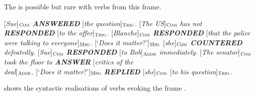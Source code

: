 \documentclass[output=paper,colorlinks,citecolor=brown]{langscibook}
\begin{document}
The  is possible but rare with verbs from this frame.

\begin{exe}
\ex \label{ex:08response}
\begin{xlist}
\ex \label{ex:08response:a}
{[}\textit{Sue}{]}$_{\text{\textsc{Com}}}$  \textit{\textbf{ANSWERED}} [\textit{the question}]$_{\text{\textsc{Trig}}}$.
\ex \label{ex:08response:b}
{[}\textit{The US}{]}$_{\text{\textsc{Com}}}$  \textit{has not \textbf{RESPONDED}} [\textit{to the offer}]$_{\text{\textsc{Trig}}}$.
\ex \label{ex:08response:c}
{[}\textit{Blanche}{]}$_{\text{\textsc{Com}}}$  \textit{\textbf{RESPONDED}} [\textit{that the police were talking to \newline everyone}]$_{\text{\textsc{Msg}}}$.
\ex \label{ex:08response:d}
{[}`\textit{Does it matter}?']$_{\text{\textsc{Msg}}}$  [\textit{she}]$_{\text{\textsc{Com}}}$  \textit{\textbf{COUNTERED} defeatedly}.
\ex \label{ex:08response:e}
{[}\textit{Sue}{]}$_{\text{\textsc{Com}}}$  \textit{\textbf{RESPONDED}} [\textit{to Bob}]$_{\text{\textsc{Addr}}}$  \textit{immediately}. 
\ex \label{ex:08response:f}
{[}\textit{The senator}{]}$_{\text{\textsc{Com}}}$  \textit{took the floor to \textbf{ANSWER}} [\textit{critics of the \\deal}]$_{\text{\textsc{Addr}}}$. 
\ex \label{ex:08response:g}
{[}`\textit{Does it matter}?']$_{\text{\textsc{Msg}}}$ \textit{\textbf{REPLIED}} [\textit{she}]$_{\text{\textsc{Com}}}$   [\textit{to his question}]$_{\text{\textsc{Trig}}}$. 
\end{xlist}
\end{exe}

 shows the syntactic realisations of verbs evoking the frame .
\end{document}
